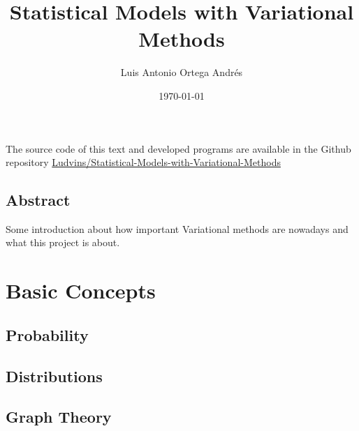 \documentclass[twoside,openright,titlepage,numbers=noenddot,openany,headinclude,footinclude=true, cleardoublepage=empty,abstractoff,BCOR=5mm,paper=a4,fontsize=11pt, dvipsnames]{scrreprt}
\author{Luis Antonio Ortega Andrés}
\date{\today}
\title{Statistical Models with Variational Methods}
\begin{document}
\maketitle
\newpage
\vspace*{\fill}
\doclicenseThis
The source code of this text and developed programs are available in the Github repository \href{https://github.com/Ludvins/Statistical-Models-with-Variational-Methods}{Ludvins/Statistical-Models-with-Variational-Methods}

\chapter*{Abstract}

Some introduction about how important Variational methods are nowadays and what this project is about.


\tableofcontents

\part{Basic Concepts}

\chapter{Probability}


\chapter{Distributions}


\chapter{Graph Theory}

\end{document}
